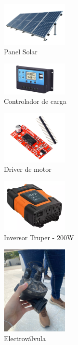 \documentclass[12pt]{article}
\begin{document}
\begin{figure}[h!]
      \centering
      \includegraphics[width=0.3\textwidth]{imagenes/pane.png}
      \caption{Panel Solar}
      \label{fig:pane}
\end{figure}

\begin{figure}[h!]
      \centering
      \includegraphics[width=0.3\textwidth]{imagenes/controlaor.png}
      \caption{Controlador de carga}
      \label{fig:controlador}
\end{figure}

\begin{figure}[h!]
      \centering
      \includegraphics[width=0.3\textwidth]{imagenes/motor.png}
      \caption{Driver de motor}
      \label{fig:motor}
\end{figure}

\begin{figure}[h!]
      \centering
      \includegraphics[width=0.3\textwidth]{imagenes/inversor.png}
      \caption{Inversor Truper - 200W}
      \label{fig:inversor}
\end{figure}

\begin{figure}[h!]
      \centering
      \includegraphics[width=0.3\textwidth]{imagenes/electrovalve2.jpg}
      \caption{Electroválvula}
      \label{fig:electrovalve}
\end{figure}
\end{document}
